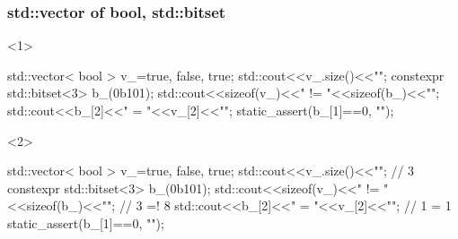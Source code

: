 \documentclass[aspectratio=43]{beamer}
\begin{document}
\begin{frame}[fragile]\frametitle{std::vector of bool, std::bitset}
\begin{onlyenv}<1>
  \begin{Cpplisting}{}
std::vector< bool > v_={true, false, true};
std::cout<<v_.size()<<"\n";
constexpr std::bitset<3> b_(0b101);
std::cout<<sizeof(v_)<<" != "<<sizeof(b_)<<"\n";
std::cout<<b_[2]<<" = "<<v_[2]<<"\n";
static_assert(b_[1]==0, "");
  \end{Cpplisting}
\end{onlyenv}
\begin{onlyenv}<2>
  \begin{Cpplisting}{}
std::vector< bool > v_={true, false, true};
std::cout<<v_.size()<<"\n"; // 3
constexpr std::bitset<3> b_(0b101);
std::cout<<sizeof(v_)<<" != "<<sizeof(b_)<<"\n"; // 3 =! 8
std::cout<<b_[2]<<" = "<<v_[2]<<"\n"; // 1 = 1
static_assert(b_[1]==0, "");
  \end{Cpplisting}
\end{onlyenv}
\end{frame}

\end{document}
